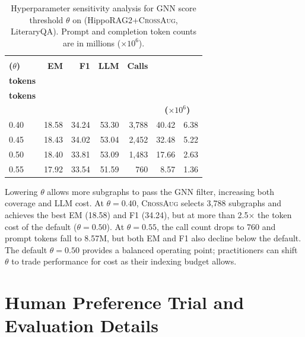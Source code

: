 \documentclass[11pt]{article}
\newcommand{\ours}{\textsc{CrossAug}\xspace}
\begin{document}
\begin{table}[!htbp]
\centering
\footnotesize
\setlength{\tabcolsep}{3pt}
\begin{tabular*}{\columnwidth}{@{\extracolsep{\fill}}lrrrrrr@{}}
\toprule
\begin{tabular}[c]{@{}c@{}}\textbf{Score}\\\textbf{($\theta$)}\end{tabular} &
\textbf{EM} & \textbf{F1} & \textbf{LLM} & \textbf{Calls} &
\begin{tabular}[c]{@{}c@{}}\textbf{Prompt}\\\textbf{tokens}\end{tabular} &
\begin{tabular}[c]{@{}c@{}}\textbf{Completion}\\\textbf{tokens}\end{tabular} \\
 & & & & & \multicolumn{2}{c}{\textbf{($\times 10^6$)}} \\
\midrule
0.40 & 18.58 & 34.24 & 53.30 & 3,788 & 40.42 & 6.38 \\
0.45 & 18.43 & 34.02 & 53.04 & 2,452 & 32.48 & 5.22 \\
0.50 & 18.40 & 33.81 & 53.09 & 1,483 & 17.66 & 2.63 \\
0.55 & 17.92 & 33.54 & 51.59 &   760 &  8.57 & 1.36 \\
\bottomrule
\end{tabular*}
\caption{Hyperparameter sensitivity analysis for GNN score threshold $\theta$ on (HippoRAG2+\ours, LiteraryQA). Prompt and completion token counts are in millions ($\times 10^6$).}
\label{tab:score-threshold}
\end{table}

Lowering $\theta$ allows more subgraphs to pass the GNN filter, increasing both coverage and LLM cost. At $\theta{=}0.40$, \ours selects 3,788 subgraphs and achieves the best EM (18.58) and F1 (34.24), but at more than 2.5$\times$ the token cost of the default ($\theta{=}0.50$). At $\theta{=}0.55$, the call count drops to 760 and prompt tokens fall to 8.57M, but both EM and F1 also decline below the default. The default $\theta{=}0.50$ provides a balanced operating point; practitioners can shift $\theta$ to trade performance for cost as their indexing budget allows.

\FloatBarrier
\section{Human Preference Trial and Evaluation Details}
\label{sec:human-eval-details}
\end{document}
